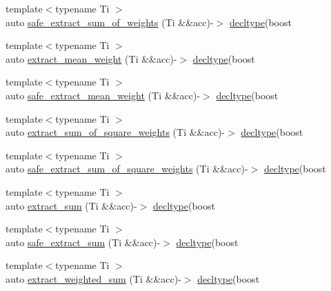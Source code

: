 \begin{DoxyCompactItemize}
\item 
{\footnotesize template$<$typename Ti $>$ }\\auto \hyperlink{namespaceIceBRG_a9571bd94986ee725009bd80d294bda96}{safe\-\_\-extract\-\_\-sum\-\_\-of\-\_\-weights} (Ti \&\&acc)-\/$>$ \hyperlink{namespaceIceBRG_a528e5024ecab03049320529180ae84a8}{decltype}(boost
\item 
{\footnotesize template$<$typename Ti $>$ }\\auto \hyperlink{namespaceIceBRG_a6cce31bbf008dace389c2fd1306f420f}{extract\-\_\-mean\-\_\-weight} (Ti \&\&acc)-\/$>$ \hyperlink{namespaceIceBRG_a528e5024ecab03049320529180ae84a8}{decltype}(boost
\item 
{\footnotesize template$<$typename Ti $>$ }\\auto \hyperlink{namespaceIceBRG_a35bbcb0530cea9e9a08663dfacca3a6a}{safe\-\_\-extract\-\_\-mean\-\_\-weight} (Ti \&\&acc)-\/$>$ \hyperlink{namespaceIceBRG_a528e5024ecab03049320529180ae84a8}{decltype}(boost
\item 
{\footnotesize template$<$typename Ti $>$ }\\auto \hyperlink{namespaceIceBRG_a850f9c8cbbc133bb6e854c7767d41ee9}{extract\-\_\-sum\-\_\-of\-\_\-square\-\_\-weights} (Ti \&\&acc)-\/$>$ \hyperlink{namespaceIceBRG_a528e5024ecab03049320529180ae84a8}{decltype}(boost
\item 
{\footnotesize template$<$typename Ti $>$ }\\auto \hyperlink{namespaceIceBRG_af5ea223ffd5a5a35005f882651a6b5f8}{safe\-\_\-extract\-\_\-sum\-\_\-of\-\_\-square\-\_\-weights} (Ti \&\&acc)-\/$>$ \hyperlink{namespaceIceBRG_a528e5024ecab03049320529180ae84a8}{decltype}(boost
\item 
{\footnotesize template$<$typename Ti $>$ }\\auto \hyperlink{namespaceIceBRG_a0265273ea4636406ab119456bb27bb69}{extract\-\_\-sum} (Ti \&\&acc)-\/$>$ \hyperlink{namespaceIceBRG_a528e5024ecab03049320529180ae84a8}{decltype}(boost
\item 
{\footnotesize template$<$typename Ti $>$ }\\auto \hyperlink{namespaceIceBRG_acab8aa76a5160bd6049763a41861fcdb}{safe\-\_\-extract\-\_\-sum} (Ti \&\&acc)-\/$>$ \hyperlink{namespaceIceBRG_a528e5024ecab03049320529180ae84a8}{decltype}(boost
\item 
{\footnotesize template$<$typename Ti $>$ }\\auto \hyperlink{namespaceIceBRG_a7e7422920de1f4154e8061887d84dd62}{extract\-\_\-weighted\-\_\-sum} (Ti \&\&acc)-\/$>$ \hyperlink{namespaceIceBRG_a528e5024ecab03049320529180ae84a8}{decltype}(boost

\end{DoxyCompactItemize}
